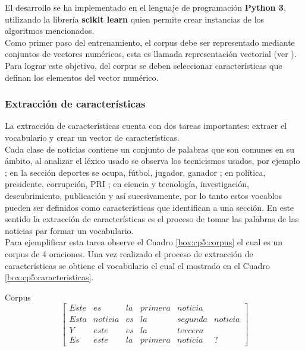 El desarrollo se ha implementado en el lenguaje de programación \textbf{Python 3}, utilizando la librería \textbf{scikit learn} quien permite crear instancias de los algoritmos mencionados.\\

Como primer paso del entrenamiento, el corpus debe ser representado mediante conjuntos de vectores numéricos, esta es llamada representación vectorial (ver ). Para lograr este objetivo, del corpus se deben seleccionar características que definan los elementos del vector numérico.\\

\subsubsection{Extracción de características}

La extracción de características cuenta con dos tareas importantes: extraer el vocabulario y crear un vector de características.\\

Cada clase de noticias contiene un conjunto de palabras que son comunes en su ámbito, al analizar el léxico usado se observa los tecnicismos usados, por ejemplo ; en la sección deportes se ocupa, fútbol, jugador, ganador ; en política, presidente, corrupción, PRI ; en ciencia y tecnología, investigación, descubrimiento, publicación y así sucesivamente, por lo tanto estos vocablos pueden ser definidos como características que identifican a una sección. En este sentido la extracción de características es el proceso de tomar las palabras de las noticias par formar un vocabulario.\\

Para ejemplificar esta tarea observe el Cuadro \ref{box:cp5:corpus} el cual es un corpus de 4 oraciones. Una vez realizado el proceso de extracción de características se obtiene el vocabulario el cual el mostrado en el Cuadro \ref{box:cp5:caracteristicas}.\\

\begin{mygraybox}[label={box:cp5:corpus}]{Corpus} 
\begin{equation*}
\begin{bmatrix}
Este&es&la&primera&noticia\\
Esta&noticia&es&la&segunda&noticia\\
Y&este&es&la&tercera\\
Es&este&la&primera&noticia&?
\end{bmatrix}
\end{equation*}
\end{mygraybox}

